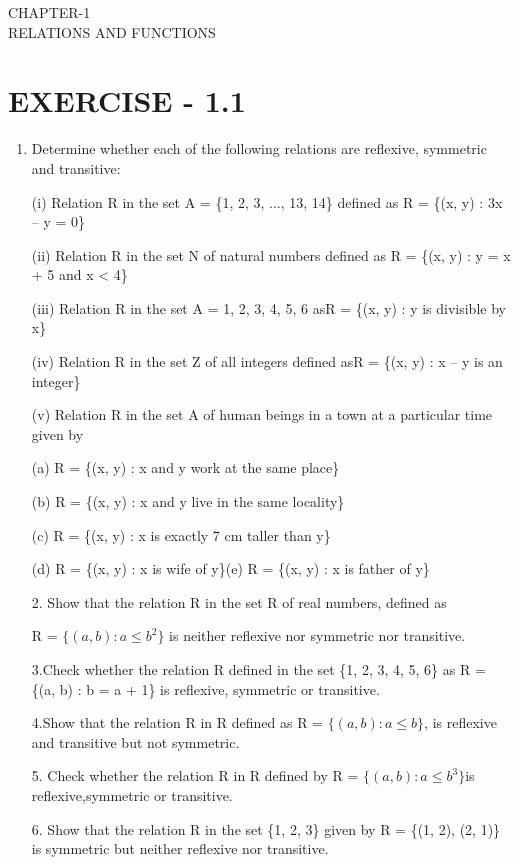 \documentclass[12pt]{article}
\begin{document}
    
\begin{center}
\textbf\large{CHAPTER-1 \\ RELATIONS AND FUNCTIONS}
\end{center}

\section*{EXERCISE - 1.1}
\begin{enumerate}
\item  Determine whether each of the following relations are reflexive, symmetric and transitive:

(i) Relation R in the set A  = \{1, 2, 3, ..., 13, 14\} defined as R = \{(x, y) : 3x  – y  = 0\}

(ii) Relation R in the set N  of natural numbers defined as R = \{(x, y) : y = x  + 5 and x  < 4\}

(iii) Relation R in the set A  = {1, 2, 3, 4, 5, 6} asR = \{(x, y) : y is divisible by x\}

(iv) Relation R in the set Z  of all integers defined asR = \{(x, y) : x – y  is an integer\}


(v) Relation R in the set A  of human beings in a town at a particular time given by

(a) R = \{(x, y) : x and y  work at the same place\}
    
(b) R = \{(x, y) : x and y  live in the same locality\}

(c) R = \{(x, y) : x is exactly 7 cm taller than y\}

(d) R = \{(x, y) : x is wife of y\}(e) R = \{(x, y) : x is father of y\}

2. Show that the relation R in the set R  of real numbers, defined as

R = $\{(a, b) : a ≤ b^2\}$ is neither reflexive nor symmetric nor transitive.

3.Check whether the relation R defined in the set \{1, 2, 3, 4, 5, 6\} as R = \{(a, b) : b = a  + 1\} is reflexive, symmetric or transitive.

4.Show that the relation R in R  defined as R = $\{(a, b) : a \leq b\}$, is reflexive and transitive but not symmetric.

5. Check whether the relation R in R  defined by R = $\{(a, b) : a \leq b^3\}$is reflexive,symmetric or transitive.

6. Show that the relation R in the set \{1, 2, 3\} given by R = \{(1, 2), (2, 1)\} is symmetric but neither reflexive nor transitive.


\end{enumerate}
\end{document}
